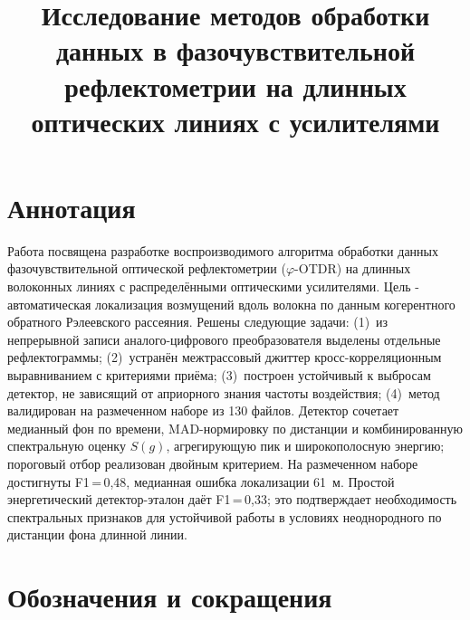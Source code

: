 \documentclass[12pt,a4paper]{extarticle}
\title{Исследование методов обработки данных в фазочувствительной\\ рефлектометрии на длинных оптических линиях с усилителями}
\newcommand{\phiOTDR}{$\varphi$-OTDR}
\begin{document}
\setcounter{page}{2}

\section*{Аннотация}

Работа посвящена разработке воспроизводимого алгоритма обработки данных фазочувствительной оптической рефлектометрии (\phiOTDR) на длинных волоконных линиях с распределёнными оптическими усилителями. Цель - автоматическая локализация возмущений вдоль волокна по данным когерентного обратного Рэлеевского рассеяния. Решены следующие задачи: (1)~из непрерывной записи аналого-цифрового преобразователя выделены отдельные рефлектограммы; (2)~устранён межтрассовый джиттер кросс-корреляционным выравниванием с критериями приёма; (3)~построен устойчивый к выбросам детектор, не зависящий от априорного знания частоты воздействия; (4)~метод валидирован на размеченном наборе из 130 файлов. Детектор сочетает медианный фон по времени, MAD-нормировку по дистанции и комбинированную спектральную оценку $S(g)$, агрегирующую пик и широкополосную энергию; пороговый отбор реализован двойным критерием. На размеченном наборе достигнуты F1\,=\,0{,}48, медианная ошибка локализации 61~м. Простой энергетический детектор-эталон даёт F1\,=\,0{,}33; это подтверждает необходимость спектральных признаков для устойчивой работы в условиях неоднородного по дистанции фона длинной линии.

\newpage

\renewcommand{\contentsname}{\hfill Содержание \hfill}
\tableofcontents

\newpage

\section*{Обозначения и сокращения}
\end{document}

